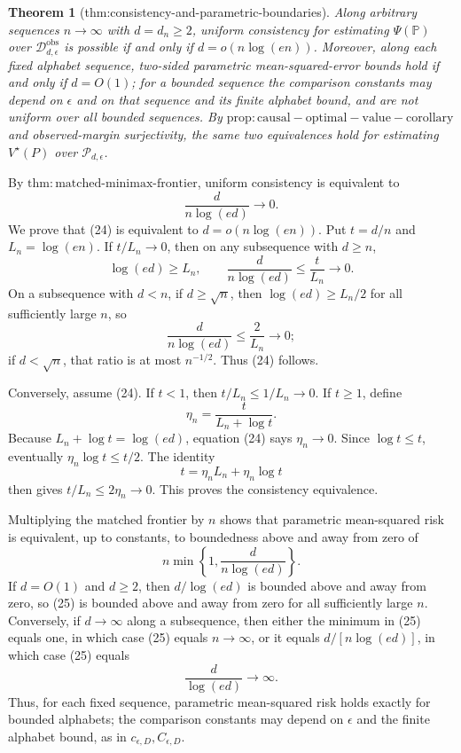 \documentclass{article}
\newtheorem{theorem}{Theorem}
\begin{document}
\begin{theorem}[thm:consistency-and-parametric-boundaries]\label{thm:consistency-and-parametric-boundaries}
Along arbitrary sequences \(n\to\infty\) with \(d=d_n\geq2\), uniform consistency for estimating \(\Psi(\mathbb P)\) over \(\mathcal D_{d,\epsilon}^{\mathrm{obs}}\) is possible if and only if \(d=o(n\log(en))\).  Moreover, along each fixed alphabet sequence, two-sided parametric mean-squared-error bounds hold if and only if \(d=O(1)\); for a bounded sequence the comparison constants may depend on \(\epsilon\) and on that sequence and its finite alphabet bound, and are not uniform over all bounded sequences.  By \(\mathrm{prop:causal-optimal-value-corollary}\) and observed-margin surjectivity, the same two equivalences hold for estimating \(V^\star(P)\) over \(\mathcal P_{d,\epsilon}\).
\end{theorem}
By \(\mathrm{thm:matched\mbox{-}minimax\mbox{-}frontier}\), uniform consistency is equivalent to
\[
 \frac d{n\log(ed)}\longrightarrow0.                               \tag{24}
\]
We prove that (24) is equivalent to \(d=o(n\log(en))\).  Put \(t=d/n\) and \(L_n=\log(en)\).  If \(t/L_n\to0\), then on any subsequence with \(d\geq n\),
\[
 \log(ed)\geq L_n,
 \qquad
 \frac d{n\log(ed)}\leq\frac t{L_n}\longrightarrow0.
\]
On a subsequence with \(d<n\), if \(d\geq\sqrt n\), then \(\log(ed)\geq L_n/2\) for all sufficiently large \(n\), so
\[
 \frac d{n\log(ed)}\leq\frac2{L_n}\longrightarrow0;
\]
if \(d<\sqrt n\), that ratio is at most \(n^{-1/2}\).  Thus (24) follows.

Conversely, assume (24).  If \(t<1\), then \(t/L_n\leq1/L_n\to0\).  If \(t\geq1\), define
\[
 \eta_n=\frac{t}{L_n+\log t}.
\]
Because \(L_n+\log t=\log(ed)\), equation (24) says \(\eta_n\to0\).  Since \(\log t\leq t\), eventually \(\eta_n\log t\leq t/2\).  The identity
\[
 t=\eta_nL_n+\eta_n\log t
\]
then gives \(t/L_n\leq2\eta_n\to0\).  This proves the consistency equivalence.

Multiplying the matched frontier by \(n\) shows that parametric mean-squared risk is equivalent, up to constants, to boundedness above and away from zero of
\[
 n\min\left\{1,\frac d{n\log(ed)}\right\}.                         \tag{25}
\]
If \(d=O(1)\) and \(d\geq2\), then \(d/\log(ed)\) is bounded above and away from zero, so (25) is bounded above and away from zero for all sufficiently large \(n\).  Conversely, if \(d\to\infty\) along a subsequence, then either the minimum in (25) equals one, in which case (25) equals \(n\to\infty\), or it equals \(d/[n\log(ed)]\), in which case (25) equals
\[
 \frac d{\log(ed)}\longrightarrow\infty.
\]
Thus, for each fixed sequence, parametric mean-squared risk holds exactly for bounded alphabets; the comparison constants may depend on \(\epsilon\) and the finite alphabet bound, as in \(c_{\epsilon,D},C_{\epsilon,D}\).
\end{document}
